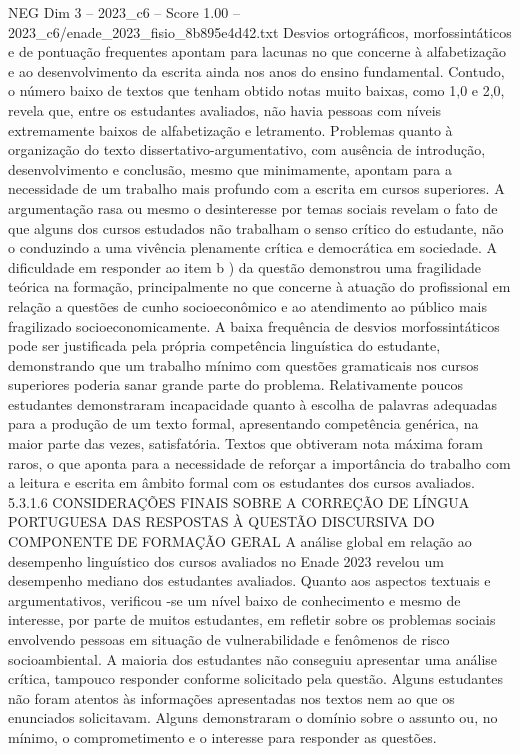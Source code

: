 \begin{textsample}{NEG Dim 3 – 2023\_c6 – Score 1.00 – 2023\_c6/enade\_2023\_fisio\_8b895e4d42.txt}
Desvios ortográficos, morfossintáticos e de pontuação frequentes apontam para lacunas no que concerne à alfabetização e ao desenvolvimento da escrita ainda nos anos do ensino fundamental.
Contudo, o número baixo de textos que tenham obtido notas muito baixas, como 1,0 e 2,0, revela que, entre os estudantes avaliados, não havia pessoas com níveis extremamente baixos de alfabetização e letramento.
Problemas quanto à organização do texto dissertativo-argumentativo, com ausência de introdução, desenvolvimento e conclusão, mesmo que minimamente, apontam para a necessidade de um trabalho mais profundo com a escrita em cursos superiores.
A argumentação rasa ou mesmo o desinteresse por temas sociais revelam o fato de que alguns dos cursos estudados não trabalham o senso crítico do estudante, não o conduzindo a uma vivência plenamente crítica e democrática em sociedade.
A dificuldade em responder ao item b ) da questão demonstrou uma fragilidade teórica na formação, principalmente no que concerne à atuação do profissional em relação a questões de cunho socioeconômico e ao atendimento ao público mais fragilizado socioeconomicamente.
A baixa frequência de desvios morfossintáticos pode ser justificada pela própria competência linguística do estudante, demonstrando que um trabalho mínimo com questões gramaticais nos cursos superiores poderia sanar grande parte do problema.
Relativamente poucos estudantes demonstraram incapacidade quanto à escolha de palavras adequadas para a produção de um texto formal, apresentando competência genérica, na maior parte das vezes, satisfatória.
Textos que obtiveram nota máxima foram raros, o que aponta para a necessidade de reforçar a importância do trabalho com a leitura e escrita em âmbito formal com os estudantes dos cursos avaliados. 5.3.1.6 CONSIDERAÇÕES FINAIS SOBRE A CORREÇÃO DE LÍNGUA PORTUGUESA DAS RESPOSTAS À QUESTÃO DISCURSIVA DO COMPONENTE DE FORMAÇÃO GERAL A análise global em relação ao desempenho linguístico dos cursos avaliados no Enade 2023 revelou um desempenho mediano dos estudantes avaliados.
Quanto aos aspectos textuais e argumentativos, verificou -se um nível baixo de conhecimento e mesmo de interesse, por parte de muitos estudantes, em refletir sobre os problemas sociais envolvendo pessoas em situação de vulnerabilidade e fenômenos de risco socioambiental.
A maioria dos estudantes não conseguiu apresentar uma análise crítica, tampouco responder conforme solicitado pela questão.
Alguns estudantes não foram atentos às informações apresentadas nos textos nem ao que os enunciados solicitavam.
Alguns demonstraram o domínio sobre o assunto ou, no mínimo, o comprometimento e o interesse para responder as questões.

\end{textsample}
